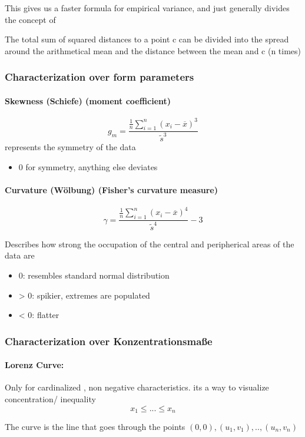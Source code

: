 \documentclass{article}
\begin{document}
This gives us a faster formula for empirical variance, and just generally divides the concept of

The total sum of squared distances to a point c can be divided into the spread around the arithmetical mean and the distance between the mean and c (n times)


\subsubsection{Characterization over form parameters}
\paragraph{Skewness (Schiefe) (moment coefficient)}
\[g_m = \frac{\frac{1}{n}\sum_{i=1}^n(x_i-\overline{x})^3}{\tilde{s}^3}\]
represents the symmetry of the data
\begin{itemize}
    \item 0 for symmetry, anything else deviates
\end{itemize}

\paragraph{ Curvature (Wölbung) (Fisher's curvature measure)}

\[\gamma = \frac{\frac{1}{n}\sum_{i=1}^n(x_i-\overline{x})^4}{\tilde{s}^4} - 3\]

Describes how strong the occupation of the central and peripherical areas of the data are
\begin{itemize}
    \item 0: resembles standard normal distribution
    \item > 0: spikier, extremes are populated
    \item < 0: flatter
\end{itemize}

\subsubsection{Characterization over Konzentrationsmaße}
\paragraph{Lorenz Curve: } Only for cardinalized , non negative characteristics. its a way to visualize concentration/ inequality
\[x_1\leq ... \leq x_n\]

The curve is the line that goes through the points $(0,0),(u_1,v_1),..,(u_n,v_n)$
\end{document}
